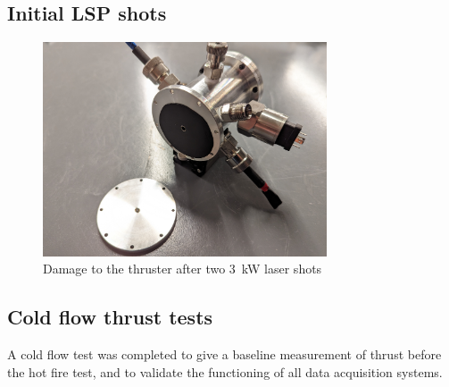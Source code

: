         \subsection{Initial LSP shots}

            \begin{figure}
                \centering
                \includegraphics[width=0.75\textwidth]{assets/5 results/V2 test damage.jpg}
                \caption{Damage to the thruster after two \qty{3}{kW} laser shots}
            \end{figure}
        
        \subsection{Cold flow thrust tests}

            A cold flow test was completed to give a baseline measurement of thrust before the hot fire test, and to validate the functioning of all data acquisition systems.